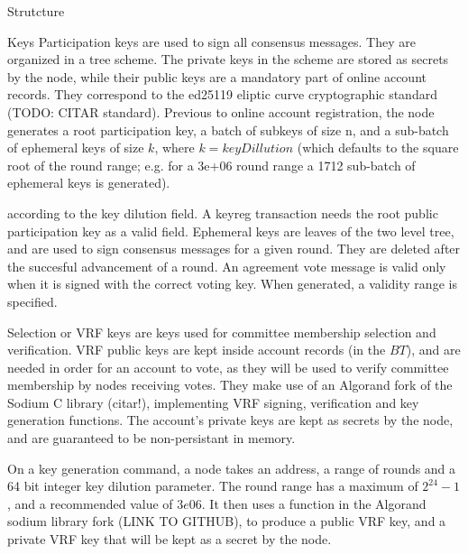\documentclass[10pt,a4paper]{article}
\begin{document}
\begin{section}{Strutcture}
\begin{subsection}{Keys}
    Participation keys are used to sign all consensus messages. They are organized in a tree scheme.
    The private keys in the scheme are stored as secrets by the node,
    while their public keys are a mandatory part of online account records.
    They correspond to the ed25119 eliptic curve cryptographic standard (TODO: CITAR standard).
    Previous to online account registration, the node generates a root participation key, a batch of subkeys
    of size n, and a sub-batch of ephemeral keys of size $k$, where $k = keyDillution$ (which defaults to the square
    root of the round range; e.g. for a 3e+06 round range a 1712 sub-batch of ephemeral keys is generated).
    
        according to the key dilution field.
    A keyreg transaction needs the root public participation key as a valid field.
    Ephemeral keys are leaves of the two level tree, and are used to sign consensus messages for a given round.
    They are deleted after the succesful advancement of a round.
    An agreement vote message is valid only when it is signed with the correct voting key.
    When generated, a validity range is specified.


    Selection or VRF keys are keys used for committee membership selection and verification.
    VRF public keys are kept inside account records (in the $BT$),
    and are needed in order for an account to vote, as they will be
    used to verify committee membership by nodes receiving votes.
    They make use of an Algorand fork of the Sodium C library (citar!), implementing VRF signing, verification and
    key generation functions.
    The account's private keys are kept as secrets by the node, and are guaranteed to be non-persistant in memory.



    On a key generation command, a node takes an address, a range of rounds and a 64
    bit integer key dilution parameter. The round range has a maximum of $2^{24} - 1$, and a recommended
    value of $3e06$. It then uses a function in the Algorand sodium library fork (LINK TO GITHUB),
    to produce a public VRF key, and a private VRF key that will be kept as a secret by the node.
    

\end{subsection}
\end{section}
\end{document}
